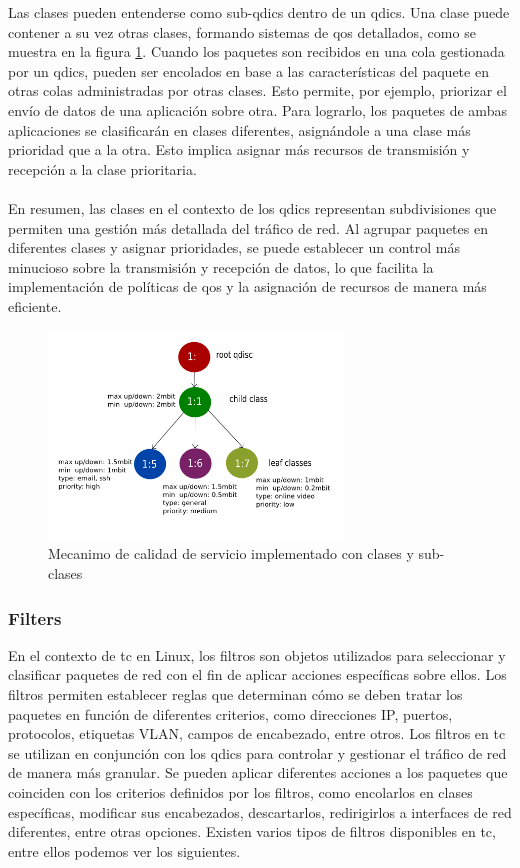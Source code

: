 Las clases pueden entenderse como sub-qdics dentro de un qdics. Una clase puede contener a su vez otras clases, formando sistemas de  \gls{qos} detallados, como se muestra en la figura \ref{fig:linuxNet_tc}. Cuando los paquetes son recibidos en una cola gestionada por un qdics, pueden ser encolados en base a las características del paquete en otras colas administradas por otras clases. Esto permite, por ejemplo, priorizar el envío de datos de una aplicación sobre otra. Para lograrlo, los paquetes de ambas aplicaciones se clasificarán en clases diferentes, asignándole a una clase más prioridad que a la otra. Esto implica asignar más recursos de transmisión y recepción a la clase prioritaria.\\
\\
En resumen, las clases en el contexto de los qdics representan subdivisiones que permiten una gestión más detallada del tráfico de red. Al agrupar paquetes en diferentes clases y asignar prioridades, se puede establecer un control más minucioso sobre la transmisión y recepción de datos, lo que facilita la implementación de políticas de \gls{qos} y la asignación de recursos de manera más eficiente.
\begin{figure}[ht]
    \centering
    \includegraphics[width=0.7\textwidth]{archivos/img/teoria/tc_qdisc_example_implementation.png}
    \caption{Mecanimo de calidad de servicio implementado con clases y sub-clases \cite{qdiscs}}
    \label{fig:linuxNet_tc}
\end{figure}


\subsubsection{Filters}

En el contexto de \gls{tc} en Linux, los filtros son objetos utilizados para seleccionar y clasificar paquetes de red con el fin de aplicar acciones específicas sobre ellos. Los filtros permiten establecer reglas que determinan cómo se deben tratar los paquetes en función de diferentes criterios, como direcciones IP, puertos, protocolos, etiquetas VLAN, campos de encabezado, entre otros. Los filtros en \gls{tc} se utilizan en conjunción con los qdics para controlar y gestionar el tráfico de red de manera más granular. Se pueden aplicar diferentes acciones a los paquetes que coinciden con los criterios definidos por los filtros, como encolarlos en clases específicas, modificar sus encabezados, descartarlos, redirigirlos a interfaces de red diferentes, entre otras opciones. Existen varios tipos de filtros disponibles en \gls{tc}, entre ellos podemos ver los siguientes.

